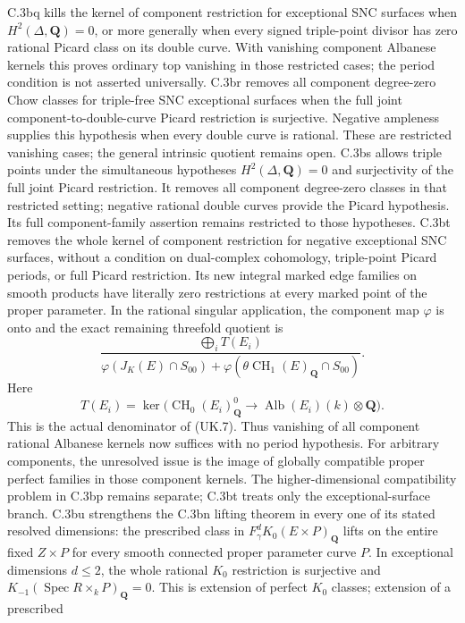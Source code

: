 C.3bq kills the kernel of component restriction for exceptional SNC
surfaces when $H^2(\Delta,\mathbf Q)=0$, or more generally when every
signed triple-point divisor has zero rational Picard class on its double
curve. With vanishing component Albanese kernels this proves ordinary
top vanishing in those restricted cases; the period condition is not
asserted universally.
C.3br removes all component degree-zero Chow classes for triple-free
SNC exceptional surfaces when the full joint component-to-double-curve
Picard restriction is surjective. Negative ampleness supplies this
hypothesis when every double curve is rational. These are restricted
vanishing cases; the general intrinsic quotient remains open.
C.3bs allows triple points under the simultaneous hypotheses
$H^2(\Delta,\mathbf Q)=0$ and surjectivity of the full joint Picard
restriction. It removes all component degree-zero classes in that
restricted setting; negative rational double curves provide the Picard
hypothesis. Its full component-family assertion remains restricted to
those hypotheses.
C.3bt removes the whole kernel of component restriction for negative
exceptional SNC surfaces, without a condition on dual-complex cohomology,
triple-point Picard periods, or full Picard restriction. Its new integral
marked edge families on smooth products have literally zero restrictions
at every marked point of the proper parameter. In the rational singular
application, the component map $\varphi$ is onto and the exact remaining
threefold quotient is
\[
 \frac{\displaystyle\bigoplus_i T(E_i)}
 {\varphi(J_K(E)\cap S_{00})+
  \varphi(\theta\operatorname{CH}_1(E)_{\mathbf Q}\cap S_{00})}.
\]
Here
\[
 T(E_i)=\ker\bigl(\operatorname{CH}_0(E_i)^0_{\mathbf Q}
          \longrightarrow\operatorname{Alb}(E_i)(k)\otimes\mathbf Q\bigr).
\]
This is the actual denominator of (UK.7). Thus vanishing of all component
rational Albanese kernels now suffices with no period hypothesis.
For arbitrary components, the unresolved issue is the image of globally
compatible proper perfect families in those component kernels. The
higher-dimensional compatibility problem in C.3bp remains separate;
C.3bt treats only the exceptional-surface branch.
C.3bu strengthens the C.3bn lifting theorem in every one of its stated
resolved dimensions: the prescribed class in
$F_\gamma^dK_0(E\times P)_{\mathbf Q}$ lifts on the entire fixed
$Z\times P$ for every smooth connected proper parameter curve $P$.
In exceptional dimensions $d\le2$, the whole rational $K_0$ restriction
is surjective and $K_{-1}(\operatorname{Spec}R\times_kP)_{\mathbf Q}=0$.
This is extension of perfect $K_0$ classes; extension of a prescribed
